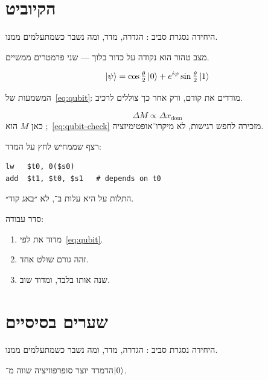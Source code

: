 \chapter{הקיוביט}
\label{ch:qubit}

היחידה נסגרת סביב : הגדרה, מדד, ומה נשבר כשמתעלמים ממנו.

\begin{defbox}[frametitle={הגדרה — הקיוביט}]
מצב טהור הוא נקודה על כדור בלוך — שני פרמטרים ממשיים.
\end{defbox}

\begin{equation}
\label{eq:qubit}
\left|\psi\right\rangle=\cos\tfrac\theta2\left|0\right\rangle+e^{i\varphi}\sin\tfrac\theta2\left|1\right\rangle
\end{equation}

המשמעות של~\eqref{eq:qubit}: מודדים את  קודם, ורק אחר כך צוללים לרכיב.

\begin{equation}
\label{eq:qubit-check}
\Delta M \propto \Delta x_{\mathrm{dom}}
\end{equation}
כאן $M$ הוא ;~\eqref{eq:qubit-check} מזכירה לחפש רגישות, לא מיקרו־אופטימיזציה.

רצף שממחיש לחץ על המדד:
\begin{asmblock}
\begin{lstlisting}[style=asm]
lw   $t0, 0($s0)
add  $t1, $t0, $s1   # depends on t0
\end{lstlisting}
\end{asmblock}
התלות על  היא עלות ב־, לא ״באג קוד״.

סדר עבודה:
\begin{enumerate}
\item[(\textbf{א})] מדוד את  לפי~\eqref{eq:qubit}.
\item[(\textbf{ב})] זהה גורם שולט אחד.
\item[(\textbf{ג})] שנה אותו בלבד, ומדוד שוב.
\end{enumerate}

\chapter{שערים בסיסיים}
\label{ch:gates}

היחידה נסגרת סביב : הגדרה, מדד, ומה נשבר כשמתעלמים ממנו.

\begin{keybox}[frametitle={רעיון מפתח — שערים בסיסיים}]
הדמרד יוצר סופרפוזיציה שווה מ־$\left|0\right\rangle$.
\end{keybox}


